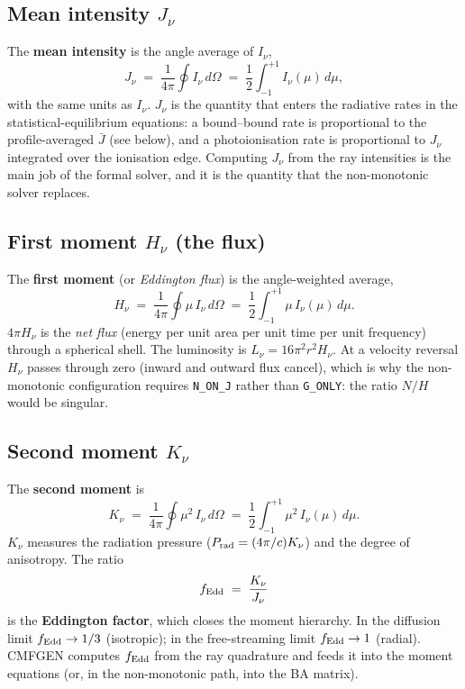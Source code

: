 \documentclass[11pt]{article}
\begin{document}
\subsection{Mean intensity \texorpdfstring{$J_\nu$}{J\_nu}}

The \textbf{mean intensity} is the angle average of $I_\nu$,
\begin{equation}
  J_\nu \;=\; \frac{1}{4\pi}\oint I_\nu\,d\Omega
  \;=\; \frac{1}{2}\int_{-1}^{+1} I_\nu(\mu)\,d\mu ,
\end{equation}
with the same units as $I_\nu$.  $J_\nu$ is the quantity that enters the
radiative rates in the statistical-equilibrium equations: a
bound--bound rate is proportional to the profile-averaged $\bar J$
(see below), and a photoionisation rate is proportional to
$J_\nu$ integrated over the ionisation edge.  Computing $J_\nu$ from
the ray intensities is the main job of the formal solver, and it is the
quantity that the non-monotonic solver replaces.

\subsection{First moment \texorpdfstring{$H_\nu$}{H\_nu} (the flux)}

The \textbf{first moment} (or \emph{Eddington flux}) is the
angle-weighted average,
\begin{equation}
  H_\nu \;=\; \frac{1}{4\pi}\oint \mu\, I_\nu\,d\Omega
  \;=\; \frac{1}{2}\int_{-1}^{+1} \mu\, I_\nu(\mu)\,d\mu .
\end{equation}
$4\pi H_\nu$ is the \emph{net flux} (energy per unit area per unit time
per unit frequency) through a spherical shell.  The luminosity is
$L_\nu = 16\pi^{2} r^{2} H_\nu$.  At a velocity reversal $H_\nu$ passes
through zero (inward and outward flux cancel), which is why the
non-monotonic configuration requires \texttt{N\_ON\_J} rather than
\texttt{G\_ONLY}: the ratio $N/H$ would be singular.

\subsection{Second moment \texorpdfstring{$K_\nu$}{K\_nu}}

The \textbf{second moment} is
\begin{equation}
  K_\nu \;=\; \frac{1}{4\pi}\oint \mu^{2}\, I_\nu\,d\Omega
  \;=\; \frac{1}{2}\int_{-1}^{+1} \mu^{2}\, I_\nu(\mu)\,d\mu .
\end{equation}
$K_\nu$ measures the radiation pressure ($P_{\rm rad} = (4\pi/c)K_\nu$)
and the degree of anisotropy.  The ratio
\begin{equation}
  f_{\rm Edd} \;=\; \frac{K_\nu}{J_\nu}
\end{equation}
is the \textbf{Eddington factor}, which closes the moment hierarchy.
In the diffusion limit $f_{\rm Edd} \to 1/3$ (isotropic); in the
free-streaming limit $f_{\rm Edd} \to 1$ (radial).  CMFGEN computes
$f_{\rm Edd}$ from the ray quadrature and feeds it into the moment
equations (or, in the non-monotonic path, into the BA matrix).
\end{document}
